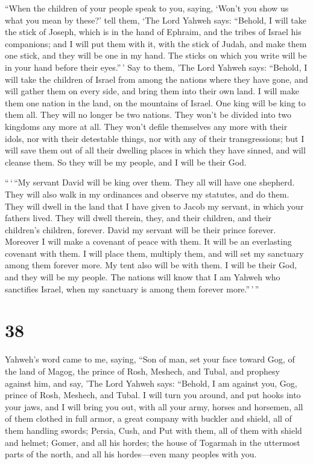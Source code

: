  ``When the children of your people speak to you, saying,
`Won't you show us what you mean by these?'  tell them,
`The Lord Yahweh says: ``Behold, I will take the stick of Joseph, which
is in the hand of Ephraim, and the tribes of Israel his companions; and
I will put them with it, with the stick of Judah, and make them one
stick, and they will be one in my hand.  The sticks on
which you write will be in your hand before their eyes.''\,'
 Say to them, 'The Lord Yahweh says: ``Behold, I will
take the children of Israel from among the nations where they have gone,
and will gather them on every side, and bring them into their own land.
 I will make them one nation in the land, on the
mountains of Israel. One king will be king to them all. They will no
longer be two nations. They won't be divided into two kingdoms any more
at all.  They won't defile themselves any more with their
idols, nor with their detestable things, nor with any of their
transgressions; but I will save them out of all their dwelling places in
which they have sinned, and will cleanse them. So they will be my
people, and I will be their God.

 ``\,`\,``My servant David will be king over them. They
all will have one shepherd. They will also walk in my ordinances and
observe my statutes, and do them.  They will dwell in the
land that I have given to Jacob my servant, in which your fathers lived.
They will dwell therein, they, and their children, and their children's
children, forever. David my servant will be their prince forever.
 Moreover I will make a covenant of peace with them. It
will be an everlasting covenant with them. I will place them, multiply
them, and will set my sanctuary among them forever more. 
My tent also will be with them. I will be their God, and they will be my
people.  The nations will know that I am Yahweh who
sanctifies Israel, when my sanctuary is among them forever
more.''\,'\,''

\hypertarget{section-36}{%
\section{38}\label{section-36}}

 Yahweh's word came to me, saying,  ``Son of
man, set your face toward Gog, of the land of Magog, the prince of Rosh,
Meshech, and Tubal, and prophesy against him,  and say,
'The Lord Yahweh says: ``Behold, I am against you, Gog, prince of Rosh,
Meshech, and Tubal.  I will turn you around, and put hooks
into your jaws, and I will bring you out, with all your army, horses and
horsemen, all of them clothed in full armor, a great company with
buckler and shield, all of them handling swords;  Persia,
Cush, and Put with them, all of them with shield and helmet;
 Gomer, and all his hordes; the house of Togarmah in the
uttermost parts of the north, and all his hordes---even many peoples
with you.

